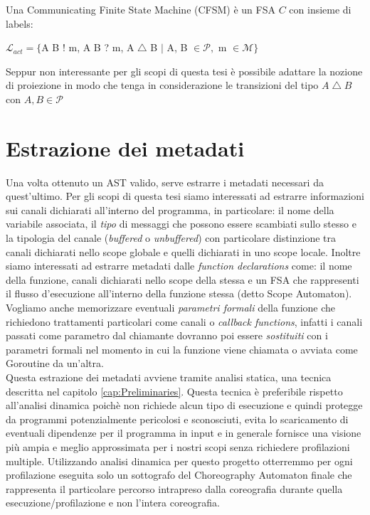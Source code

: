 \begin{definition}
    Una Communicating Finite State Machine (CFSM) è un FSA $C$ con insieme di labels:
    \bigskip \\
    \centerline{$\mathcal{L}_{act} = \{$A B ! m, A B ? m, A $\bigtriangleup$ B $|$ A, B $ \in \mathcal{P},$ m $ \in \mathcal{M}\}$}
\end{definition}

\begin{remark}
    Seppur non interessante per gli scopi di questa tesi è possibile adattare la nozione di proiezione in modo che tenga in considerazione le transizioni del tipo $A \bigtriangleup B$ con $A, B \in \mathcal{P}$
\end{remark}


\section{Estrazione dei metadati}
Una volta ottenuto un AST valido, serve estrarre i metadati necessari da quest'ultimo. Per gli scopi di questa tesi siamo interessati ad estrarre informazioni sui canali dichiarati all'interno del programma, in particolare: il nome della variabile associata, il \emph{tipo} di messaggi che possono essere scambiati sullo stesso e la tipologia del canale (\emph{buffered} o \emph{unbuffered}) con particolare distinzione tra canali dichiarati nello scope globale e quelli dichiarati in uno scope locale. Inoltre siamo interessati ad estrarre metadati dalle \emph{function declarations} come: il nome della funzione, canali dichiarati nello scope della stessa e un FSA che rappresenti il flusso d'esecuzione all'interno della funzione stessa (detto Scope Automaton). Vogliamo anche memorizzare eventuali \emph{parametri formali} della funzione che richiedono trattamenti particolari come canali o \emph{callback functions}, infatti i canali passati come parametro dal chiamante dovranno poi essere \emph{sostituiti} con i parametri formali nel momento in cui la funzione viene chiamata o avviata come Goroutine da un'altra. \bigskip \\
Questa estrazione dei metadati avviene tramite analisi statica, una tecnica descritta nel capitolo \ref{cap:Preliminaries}. Questa tecnica è preferibile rispetto all'analisi dinamica poichè non richiede alcun tipo di esecuzione e quindi protegge da programmi potenzialmente pericolosi e sconosciuti, evita lo scaricamento di eventuali dipendenze per il programma in input e in generale fornisce una visione più ampia e meglio approssimata per i nostri scopi senza richiedere profilazioni multiple. Utilizzando analisi dinamica per questo progetto otterremmo per ogni profilazione eseguita solo un sottografo del Choreography Automaton finale che rappresenta il particolare percorso intrapreso dalla coreografia durante quella esecuzione/profilazione e non l'intera coreografia.

